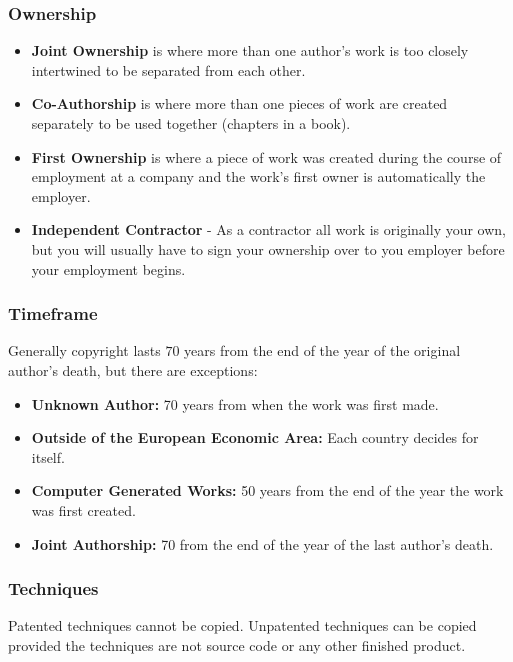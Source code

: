 \subsubsection{Ownership}\label{ssub:ownership}

\begin{itemize}
    \item \textbf{Joint Ownership} is where more than one author's work is too closely intertwined to be separated from each other.
    \item \textbf{Co-Authorship} is where more than one pieces of work are created separately to be used together (chapters in a book).
    \item \textbf{First Ownership} is where a piece of work was created during the course of employment at a company and the work's first owner is automatically the employer.
    \item \textbf{Independent Contractor} - As a contractor all work is originally your own, but you will usually have to sign your ownership over to you employer before your employment begins.
\end{itemize}

\subsubsection{Timeframe}\label{ssub:timeframe}

Generally copyright lasts \(70\) years from the end of the year of the original author's death, but there are exceptions:

\begin{itemize}
    \item \textbf{Unknown Author:} 70 years from when the work was first made.
    \item \textbf{Outside of the European Economic Area:} Each country decides for itself.
    \item \textbf{Computer Generated Works:} 50 years from the end of the year the work was first created.
    \item \textbf{Joint Authorship:} 70 from the end of the year of the last author's death.
\end{itemize}

\subsubsection{Techniques}\label{ssub:techniques}

Patented techniques cannot be copied.
Unpatented techniques can be copied provided the techniques are not source code or any other finished product.

